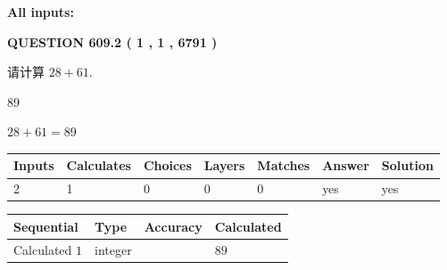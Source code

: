 \documentclass{ctexart}
\begin{document}
   
   
   
\noindent{}
   
   
   
   
\noindent\vspace{0.1in}\hspace{-0.08in} {\textbf{\Large{All inputs: }}}
   
   
  
\vspace{0.2in}
  
{\textbf{\Large{QUESTION
609.2 
 ( 1 , 1 , 6791 )
}}}
  
  
 
请计算 $ %
28 +  %
61 $.
 
 
 
\noindent{}
 
 

89
 
 
\noindent{}
 
 

 
 
 
\noindent{}
 
 

$ %
28 +  %
61=   %
89$
 
 
\noindent{}
 
 

 
   
   
   
   
\noindent\begin{tabular}{|l|l|l|l|l|l|l|}
 \hline
Inputs & Calculates & Choices & Layers & Matches & Answer & Solution \\ \hline
 2  & 
 1  & 
 0
  & 
 0  & 
 0  & 
  yes & 
  yes 
  \\ \hline
 \end{tabular}
   
   
   
   
\noindent{}
   
   
  
  
\noindent\begin{tabular}{|l|l|l|l|}
\hline
 Sequential & Type & Accuracy & Calculated \\ 
\hline
 
 
  Calculated $  1 $ & integer &  & 
  $ 89 $ 
 \\  \hline  
 \end{tabular}
   
\end{document}
